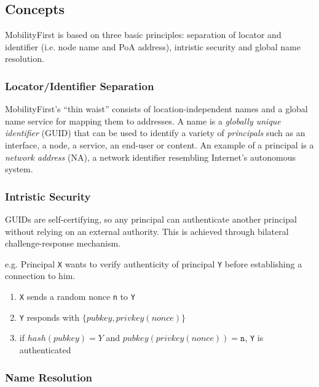         \subsection{Concepts}

            MobilityFirst is based on three basic principles: separation of locator and identifier (i.e. node name and PoA address), intristic security and global name resolution.

            \subsubsection{Locator/Identifier Separation}

                MobilityFirst's ``thin waist'' consists of location-independent names and a global name service for mapping them to addresses. A name is a \emph{globally unique identifier} (GUID) that can be used to identify a variety of \emph{principals} such as an interface, a node, a service, an end-user or content. An example of a principal is a \emph{network address} (NA), a network identifier resembling Internet's autonomous system.

            \subsubsection{Intristic Security}\label{archs:mf:security}

                GUIDs are self-certifying, so any principal can authenticate another principal without relying on an external authority. This is achieved through bilateral challenge-response mechanism.

                e.g. Principal \texttt{X} wants to verify authenticity of principal \texttt{Y} before establishing a connection to him.
                \begin{enumerate}
                    \item \texttt{X} sends a random nonce \texttt{n} to \texttt{Y}
                    \item \texttt{Y} responds with $\{pubkey, privkey(nonce)\}$
                    \item if $hash(pubkey) = Y$ and $pubkey(privkey(nonce)) = \texttt{n}$, \texttt{Y} is authenticated
                \end{enumerate}

            \subsubsection{Name Resolution}

